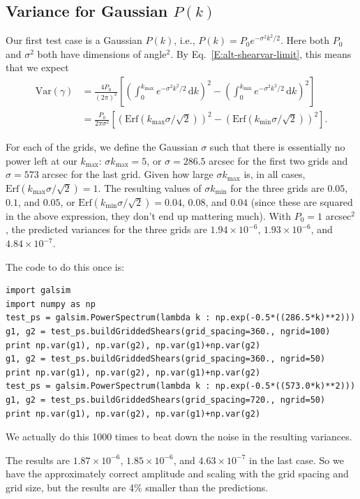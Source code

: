 \documentclass[preprint]{aastex}
\newcommand{\kmax}{\ensuremath{k_\mathrm{max}}}
\newcommand{\kmin}{\ensuremath{k_\mathrm{min}}}
\newcommand{\rmd}{\ensuremath{\mathrm{d}}}
\begin{document}
\subsection{Variance for Gaussian $P(k)$}

Our first test case is a Gaussian $P(k)$, i.e., $P(k) =
P_0 e^{-\sigma^2 k^2 / 2}$.  Here both $P_0$ and $\sigma^2$ both
have dimensions of angle$^2$.  By Eq.~\ref{E:alt-shearvar-limit}, this
means that we expect
\begin{align}
\mathrm{Var}(\gamma) &= \frac{4P_0}{(2\pi)^2} \left[\left(\int_{0}^{\kmax} 
e^{-\sigma^2 k^2/2} \,\rmd k\right)^2 - \left(\int_{0}^{\kmin} 
e^{-\sigma^2 k^2/2} \,\rmd k\right)^2\right] \\
 &= \frac{P_0}{2\pi\sigma^2}\left[ \left(\mathrm{Erf}(\kmax\sigma/\sqrt{2})\right)^2 - \left(\mathrm{Erf}(\kmin\sigma/\sqrt{2})\right)^2\right].\label{E:vargauss}
\end{align}

For each of the grids, we define the Gaussian $\sigma$ such that there
is essentially no power left at our \kmax: $\sigma\kmax=5$, or
$\sigma=286.5$ arcsec for the first two grids and $\sigma=573$ arcsec
for the last grid.  Given how large $\sigma\kmax$ is, in all cases,
$\mathrm{Erf}(\kmax\sigma/\sqrt{2})=1$.  The resulting values of
$\sigma\kmin$ for the three grids are $0.05$, $0.1$, and $0.05$, or
$\mathrm{Erf}(\kmin\sigma/\sqrt{2})=0.04$, $0.08$, and $0.04$ (since
these are squared in the above expression, they don't end up mattering
much).  With
$P_0=1$ arcsec$^2$, the predicted variances for the three grids are
$1.94\times 10^{-6}$, $1.93\times 10^{-6}$, and $4.84\times 10^{-7}$.

The code to do this once is:
\begin{verbatim}
import galsim
import numpy as np
test_ps = galsim.PowerSpectrum(lambda k : np.exp(-0.5*((286.5*k)**2)))
g1, g2 = test_ps.buildGriddedShears(grid_spacing=360., ngrid=100)
print np.var(g1), np.var(g2), np.var(g1)+np.var(g2)
g1, g2 = test_ps.buildGriddedShears(grid_spacing=360., ngrid=50)
print np.var(g1), np.var(g2), np.var(g1)+np.var(g2)
test_ps = galsim.PowerSpectrum(lambda k : np.exp(-0.5*((573.0*k)**2)))
g1, g2 = test_ps.buildGriddedShears(grid_spacing=720., ngrid=50)
print np.var(g1), np.var(g2), np.var(g1)+np.var(g2)
\end{verbatim}
We actually do this 1000 times to beat down the noise in the resulting
variances.

The results are $1.87\times 10^{-6}$, $1.85\times 10^{-6}$, and
$4.63\times 10^{-7}$ in the last case.  So we have the approximately
correct amplitude and scaling with the grid spacing and grid size, but
the results are 4\% smaller than the predictions.
\end{document}
